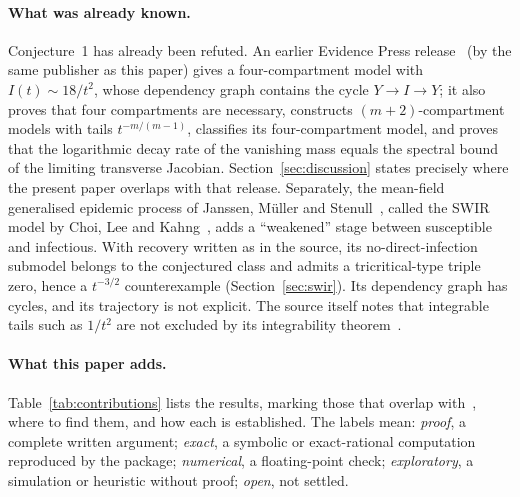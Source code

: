 \documentclass[11pt,a4paper]{article}
\theoremstyle{definition}\newtheorem{definition}[theorem]{Definition}
\theoremstyle{remark}\newtheorem{remark}[theorem]{Remark}
\begin{document}
\paragraph{What was already known.}
Conjecture~1 has already been refuted. An earlier Evidence Press
release~\cite{EPprior} (by the same publisher as this paper) gives a four-compartment model with
$I(t)\sim18/t^2$, whose dependency graph contains the cycle
$Y\to I\to Y$; it also proves that four compartments are necessary,
constructs $(m+2)$-compartment models with tails $t^{-m/(m-1)}$, classifies
its four-compartment model, and proves that the logarithmic decay rate
of the vanishing mass equals the spectral bound of the limiting
transverse Jacobian. Section~\ref{sec:discussion} states precisely
where the present paper overlaps with that release. Separately, the
mean-field generalised epidemic process of Janssen, M\"uller and
Stenull~\cite[Sec.~II]{Janssen}, called the SWIR model by Choi, Lee and
Kahng~\cite{ChoiLeeKahng}, adds a ``weakened'' stage between
susceptible and infectious. With recovery written as in the source, its
no-direct-infection submodel belongs to the conjectured class and
admits a tricritical-type triple zero, hence a $t^{-3/2}$ counterexample
(Section~\ref{sec:swir}). Its dependency graph has cycles, and its
trajectory is not explicit. The source
itself notes that integrable tails such as $1/t^2$ are not excluded by
its integrability theorem~\cite[p.~24]{CCM}.

\paragraph{What this paper adds.}
Table~\ref{tab:contributions} lists the results, marking those that
overlap with~\cite{EPprior}, where to find them,
and how each is established. The labels mean: \emph{proof}, a complete
written argument; \emph{exact}, a symbolic or exact-rational
computation reproduced by the package; \emph{numerical}, a
floating-point check; \emph{exploratory}, a simulation or heuristic
without proof; \emph{open}, not settled.
\end{document}
